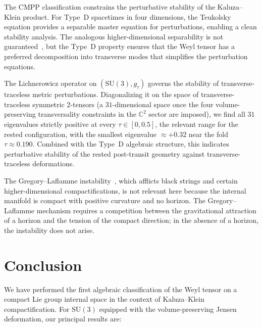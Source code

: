 \documentclass[12pt]{article}
\theoremstyle{definition}
\theoremstyle{remark}
\begin{document}
The CMPP classification constrains the perturbative stability of the Kaluza--Klein product.  For Type~D spacetimes in four dimensions, the Teukolsky equation provides a separable master equation for perturbations, enabling a clean stability analysis.  The analogous higher-dimensional separability is not guaranteed~\cite{Durkee2010}, but the Type~D property ensures that the Weyl tensor has a preferred decomposition into transverse modes that simplifies the perturbation equations.

The Lichnerowicz operator on $(\mathrm{SU}(3),g_\tau)$ governs the stability of transverse-traceless metric perturbations.  Diagonalizing it on the space of transverse-traceless symmetric 2-tensors (a $31$-dimensional space once the four volume-preserving transversality constraints in the $\mathbb{C}^2$ sector are imposed), we find all $31$ eigenvalues strictly positive at every $\tau\in[0,0.5]$, the relevant range for the rested configuration, with the smallest eigenvalue $\approx+0.32$ near the fold $\tau\approx0.190$.  Combined with the Type~D algebraic structure, this indicates perturbative stability of the rested post-transit geometry against transverse-traceless deformations.

The Gregory--Laflamme instability~\cite{GregoryLaflamme1993}, which afflicts black strings and certain higher-dimensional compactifications, is not relevant here because the internal manifold is compact with positive curvature and no horizon.  The Gregory--Laflamme mechanism requires a competition between the gravitational attraction of a horizon and the tension of the compact direction; in the absence of a horizon, the instability does not arise.

\section{Conclusion}
\label{sec:conclusion}

We have performed the first algebraic classification of the Weyl tensor on a compact Lie group internal space in the context of Kaluza--Klein compactification.  For $\mathrm{SU}(3)$ equipped with the volume-preserving Jensen deformation, our principal results are:
\end{document}
